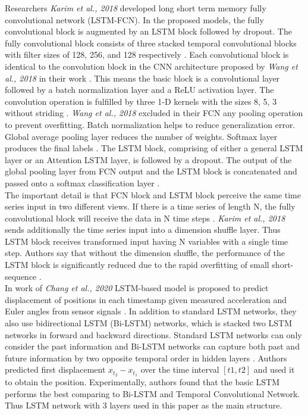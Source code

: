 Researchers \textit{Karim et al., 2018} developed long short term memory fully convolutional network (LSTM-FCN). In the proposed models, the fully convolutional block is augmented by an LSTM block followed by dropout. The fully convolutional block consists of three stacked temporal convolutional blocks with filter sizes of 128, 256, and 128 respectively \cite{lstm_fcn}. Each convolutional block is identical to the convolution block in the CNN architecture proposed by \textit{Wang et al., 2018} in their work \cite{timeseries_scratch}. This means the basic block is a convolutional layer followed by a batch normalization layer and a ReLU activation layer. The convolution operation is fulfilled by three 1-D kernels with the sizes {8, 5, 3} without striding \cite{timeseries_scratch}. \textit{Wang et al., 2018} excluded in their FCN any pooling operation to prevent overfitting. Batch normalization helps to reduce generalization error. Global average pooling layer reduces the number of weights. Softmax layer produces the final labels \cite{timeseries_scratch}. The LSTM block, comprising of either a general LSTM layer or an Attention LSTM layer, is followed by a dropout. The output of the global pooling layer from FCN output and the LSTM block is concatenated and passed onto a softmax classification layer \cite{lstm_fcn}.\\
The important detail is that FCN block and LSTM block perceive the same time series input in two different views. If there is a time series of length N, the fully convolutional block will receive the data in N time steps \cite{lstm_fcn}. \textit{Karim et al., 2018} sends additionally the time series input into a dimension shuffle layer. Thus LSTM block receives transformed input having N variables with a single time step. Authors say that without the dimension shuffle, the performance of the LSTM block is significantly reduced due to the rapid overfitting of small short-sequence \cite{lstm_fcn}.\\
In work of \textit{Chang et al., 2020} LSTM-based model is proposed to predict displacement of positions in each timestamp given measured acceleration and Euler angles from sensor signals \cite{6DoF_Tracking}. In addition to standard LSTM networks, they also use bidirectional LSTM (Bi-LSTM) networks, which is stacked two LSTM networks in forward and backward directions. Standard LSTM networks can only consider the past information and Bi-LSTM networks can capture both past and future information by two opposite temporal order in hidden layers \cite{6DoF_Tracking}. Authors predicted first displacement $x_{t_2} - x_{t_1}$ over the time interval $[t1, t2]$ and used it to obtain the position. Experimentally, authors found that the basic LSTM performs the best comparing to Bi-LSTM and Temporal Convolutional Network. Thus LSTM network with 3 layers used in this paper as the main structure.\\
